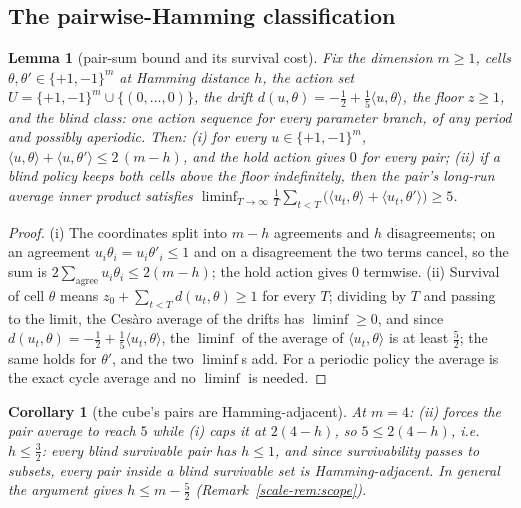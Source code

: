 \documentclass[10pt,twocolumn]{article}
\theoremstyle{plain}
\newtheorem{lemma}[theorem]{Lemma}
\newtheorem{corollary}[theorem]{Corollary}
\theoremstyle{definition}
\theoremstyle{remark}
\begin{document}
\subsection{The pairwise-Hamming classification}\label{scale-hamming}

\begin{lemma}[pair-sum bound and its survival cost]\label{scale-lem:pairsum}
Fix the dimension \(m \ge 1\), cells \(\theta, \theta' \in
\{+1,-1\}^{m}\) at Hamming distance \(h\), the action set
\(U = \{+1,-1\}^{m} \cup \{(0,\dots,0)\}\), the drift
\(d(u, \theta) = -\tfrac12 + \tfrac15\langle u, \theta\rangle\),
the floor \(z \ge 1\), and the blind class: one action sequence for
every parameter branch, of any period and possibly aperiodic. Then:
(i) for every \(u \in \{+1,-1\}^{m}\),
\(\langle u, \theta\rangle + \langle u, \theta'\rangle
\le 2\,(m - h)\), and the hold action gives \(0\) for every pair;
(ii) if a blind policy keeps both cells above the floor indefinitely,
then the pair's long-run average inner product satisfies
\(\liminf_{T \to \infty} \frac1T \sum_{t < T}
\bigl(\langle u_{t}, \theta\rangle + \langle u_{t},
\theta'\rangle\bigr) \ge 5\).
\end{lemma}

\begin{proof}
(i) The coordinates split into \(m - h\) agreements and \(h\)
disagreements; on an agreement \(u_{i}\theta_{i} = u_{i}\theta'_{i}
\le 1\) and on a disagreement the two terms cancel, so the sum is
\(2 \sum_{\text{agree}} u_{i}\theta_{i} \le 2(m-h)\); the hold
action gives \(0\) termwise. (ii) Survival of cell \(\theta\) means
\(z_{0} + \sum_{t < T} d(u_{t}, \theta) \ge 1\) for every \(T\);
dividing by \(T\) and passing to the limit, the Ces\`aro average of
the drifts has \(\liminf \ge 0\), and since
\(d(u_{t}, \theta) = -\tfrac12 + \tfrac15\langle u_{t},
\theta\rangle\), the \(\liminf\) of the average of
\(\langle u_{t}, \theta\rangle\) is at least
\(\tfrac52\); the same holds for \(\theta'\), and the two
\(\liminf\)s add. For a periodic policy the average is the exact
cycle average and no \(\liminf\) is needed.
\end{proof}

\begin{corollary}[the cube's pairs are Hamming-adjacent]
\label{scale-cor:hamming}
At \(m = 4\): (ii) forces the pair average to reach \(5\) while (i)
caps it at \(2(4 - h)\), so \(5 \le 2(4 - h)\), i.e.\
\(h \le \tfrac32\): every blind survivable pair has \(h \le 1\),
and since survivability passes to subsets, every pair inside a blind
survivable set is Hamming-adjacent. In general the argument gives
\(h \le m - \tfrac52\) (Remark~\ref{scale-rem:scope}).
\end{corollary}
\end{document}
